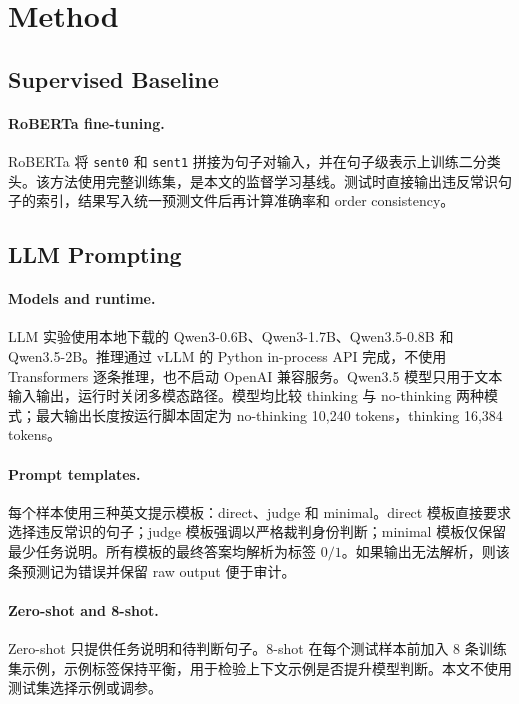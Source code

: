 \section{Method}

\subsection{Supervised Baseline}

\paragraph{RoBERTa fine-tuning.}
RoBERTa 将 \texttt{sent0} 和 \texttt{sent1} 拼接为句子对输入，并在句子级表示上训练二分类头。该方法使用完整训练集，是本文的监督学习基线。测试时直接输出违反常识句子的索引，结果写入统一预测文件后再计算准确率和 order consistency。

\subsection{LLM Prompting}

\paragraph{Models and runtime.}
LLM 实验使用本地下载的 Qwen3-0.6B、Qwen3-1.7B、Qwen3.5-0.8B 和 Qwen3.5-2B。推理通过 vLLM 的 Python in-process API 完成，不使用 Transformers 逐条推理，也不启动 OpenAI 兼容服务。Qwen3.5 模型只用于文本输入输出，运行时关闭多模态路径。模型均比较 thinking 与 no-thinking 两种模式；最大输出长度按运行脚本固定为 no-thinking 10,240 tokens，thinking 16,384 tokens。

\paragraph{Prompt templates.}
每个样本使用三种英文提示模板：direct、judge 和 minimal。direct 模板直接要求选择违反常识的句子；judge 模板强调以严格裁判身份判断；minimal 模板仅保留最少任务说明。所有模板的最终答案均解析为标签 \(0/1\)。如果输出无法解析，则该条预测记为错误并保留 raw output 便于审计。

\paragraph{Zero-shot and 8-shot.}
Zero-shot 只提供任务说明和待判断句子。8-shot 在每个测试样本前加入 8 条训练集示例，示例标签保持平衡，用于检验上下文示例是否提升模型判断。本文不使用测试集选择示例或调参。

